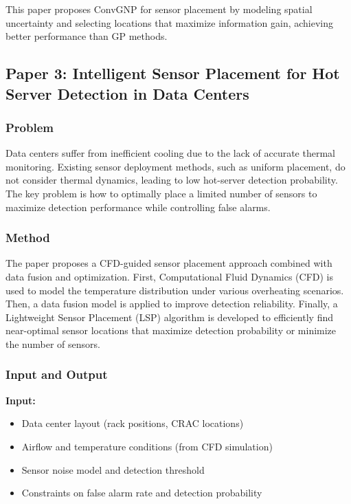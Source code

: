 \documentclass[12pt,a4paper]{article}
\begin{document}
                This paper proposes ConvGNP for sensor placement by modeling spatial uncertainty and selecting locations that maximize information gain, achieving better performance than GP methods.

\newpage

\subsection{Paper 3:
        Intelligent Sensor Placement for Hot Server Detection in Data Centers}
    \subsubsection{Problem}

                Data centers suffer from inefficient cooling due to the lack of accurate thermal monitoring. Existing sensor deployment methods, such as uniform placement, do not consider thermal dynamics, leading to low hot-server detection probability. 
                The key problem is how to optimally place a limited number of sensors to maximize detection performance while controlling false alarms.

    \subsubsection{Method}
    
                The paper proposes a CFD-guided sensor placement approach combined with data fusion and optimization. First, Computational Fluid Dynamics (CFD) is used to model the temperature distribution under various overheating scenarios. Then, a data fusion model is applied to improve detection reliability. Finally, a Lightweight Sensor Placement (LSP) algorithm is developed to efficiently find near-optimal sensor locations that maximize detection probability or minimize the number of sensors.
 
    \subsubsection{Input and Output}

            \textbf{Input:}
            \begin{itemize}
                \item Data center layout (rack positions, CRAC locations)
                \item Airflow and temperature conditions (from CFD simulation)
                \item Sensor noise model and detection threshold
                \item Constraints on false alarm rate and detection probability
            \end{itemize}
            
\end{document}

